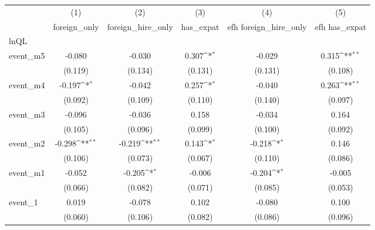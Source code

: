 {
\def\sym#1{\ifmmode^{#1}\else\(^{#1}\)\fi}
\begin{tabular}{l*{5}{c}}
\hline\hline
            &\multicolumn{1}{c}{(1)}&\multicolumn{1}{c}{(2)}&\multicolumn{1}{c}{(3)}&\multicolumn{1}{c}{(4)}&\multicolumn{1}{c}{(5)}\\
            &\multicolumn{1}{c}{foreign\_only}&\multicolumn{1}{c}{foreign\_hire\_only}&\multicolumn{1}{c}{has\_expat}&\multicolumn{1}{c}{efh foreign\_hire\_only}&\multicolumn{1}{c}{efh has\_expat}\\
\hline
lnQL        &                     &                     &                     &                     &                     \\
event\_m5    &      -0.080         &      -0.030         &       0.307\sym{*}  &      -0.029         &       0.315\sym{**} \\
            &     (0.119)         &     (0.134)         &     (0.131)         &     (0.131)         &     (0.108)         \\
[1em]
event\_m4    &      -0.197\sym{*}  &      -0.042         &       0.257\sym{*}  &      -0.040         &       0.263\sym{**} \\
            &     (0.092)         &     (0.109)         &     (0.110)         &     (0.140)         &     (0.097)         \\
[1em]
event\_m3    &      -0.096         &      -0.036         &       0.158         &      -0.034         &       0.164         \\
            &     (0.105)         &     (0.096)         &     (0.099)         &     (0.100)         &     (0.092)         \\
[1em]
event\_m2    &      -0.298\sym{**} &      -0.219\sym{**} &       0.143\sym{*}  &      -0.218\sym{*}  &       0.146         \\
            &     (0.106)         &     (0.073)         &     (0.067)         &     (0.110)         &     (0.086)         \\
[1em]
event\_m1    &      -0.052         &      -0.205\sym{*}  &      -0.006         &      -0.204\sym{*}  &      -0.005         \\
            &     (0.066)         &     (0.082)         &     (0.071)         &     (0.085)         &     (0.053)         \\
[1em]
event\_1     &       0.019         &      -0.078         &       0.102         &      -0.080         &       0.100         \\
            &     (0.060)         &     (0.106)         &     (0.082)         &     (0.086)         &     (0.096)         \\

\end{tabular}}
